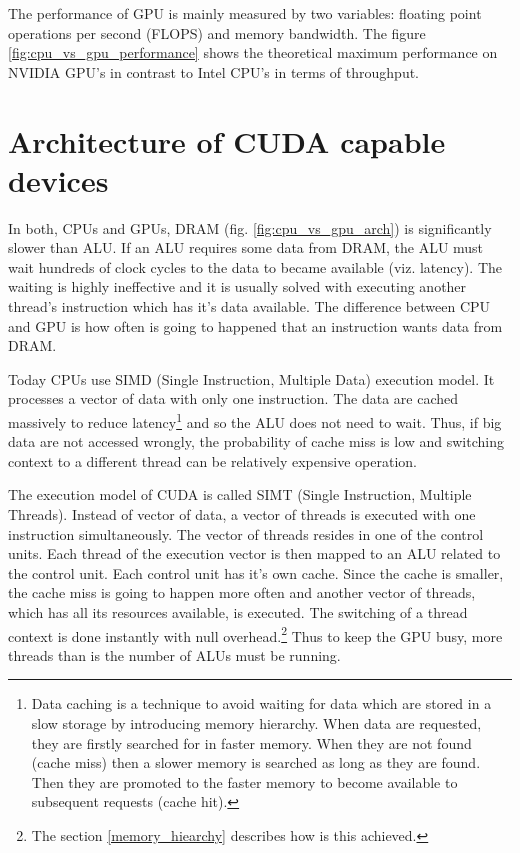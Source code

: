 \documentclass[12pt,oneside]{fithesis2}
\begin{document}
The performance of GPU is mainly measured by two variables: floating point operations per second (FLOPS) and memory bandwidth. The figure \ref{fig:cpu_vs_gpu_performance} shows the theoretical maximum performance on NVIDIA GPU's in contrast to Intel CPU's in terms of throughput.

\section{Architecture of CUDA capable devices}
\label{cuda_architecture}

In both, CPUs and GPUs, DRAM (fig. \ref{fig:cpu_vs_gpu_arch}) is significantly slower than ALU. If an ALU requires some data from DRAM, the ALU must wait hundreds of clock cycles to the data to became available (viz. latency). The waiting is highly ineffective and it is usually solved with executing another thread's instruction which has it's data available. The difference between CPU and GPU is how often is going to happened that an instruction wants data from DRAM.

Today CPUs use SIMD (Single Instruction, Multiple Data) execution model. It processes a vector of data with only one instruction. The data are cached massively to reduce latency\footnote{Data caching is a technique to avoid waiting for data which are stored in a slow storage by introducing memory hierarchy. When data are requested, they are firstly searched for in faster memory. When they are not found (cache miss) then a slower memory is searched as long as they are found. Then they are promoted to the faster memory to become available to subsequent requests (cache hit).} and so the ALU does not need to wait. Thus, if big data are not accessed wrongly, the probability of cache miss is low and switching context to a different thread can be relatively expensive operation. 

The execution model of CUDA is called SIMT (Single Instruction, Multiple Threads). Instead of vector of data, a vector of threads is executed with one instruction simultaneously. The vector of threads resides in one of the control units. Each thread of the execution vector is then mapped to an ALU related to the control unit. Each control unit has it's own cache. Since the cache is smaller, the cache miss is going to happen more often and another vector of threads, which has all its resources available, is executed. The switching of a thread context is done instantly with null overhead.\footnote{The section \ref{memory_hiearchy} describes how is this achieved.} Thus to keep the GPU busy, more threads than is the number of ALUs must be running.
\end{document}
